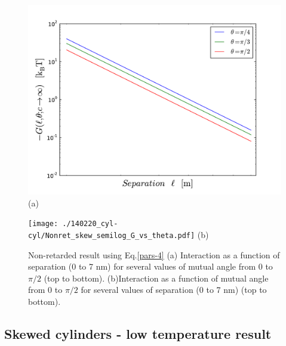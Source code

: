 \documentclass[onecolumn,letterpaper,amsmath,amssymb,floatfix,aps,superscriptaddress]{revtex4}
\begin{document}
\begin{figure}[t!]
\begin{center}
\begin{minipage}[b]{0.40\textwidth}
\begin{center}
\includegraphics[width=1.2\textwidth]{./140220_cyl-cyl/Nonret_skew_G_vs_l.pdf} (a)
\end{center}
\end{minipage}
\hskip 43pt
\begin{minipage}[b]{0.40\textwidth}
\begin{center}
\texttt{[image: ./140220\_cyl-cyl/Nonret\_skew\_semilog\_G\_vs\_theta.pdf]} (b)
\end{center}
\end{minipage}
\caption{Non-retarded result using Eq.\ref{pars-4} (a) Interaction as a function of separation (0 to 7 nm) for several values of mutual angle from 0 to $\pi/2$ (top to bottom). (b)Interaction as a function of mutual angle from 0 to $\pi/2$ for several values of separation (0 to 7 nm) (top to bottom).}
\end{center}
\end{figure} 

\subsection{Skewed cylinders - low temperature result}
\end{document}
